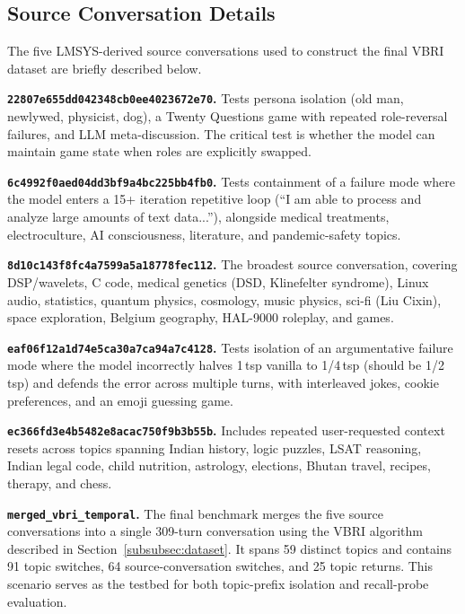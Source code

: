 \documentclass[pdflatex,sn-mathphys-num]{sn-jnl}%
\theoremstyle{thmstyleone}%
\theoremstyle{thmstyletwo}%
\theoremstyle{thmstylethree}%
\begin{document}
\begin{appendices}

\section{Source Conversation Details}\label{secA1}

The five LMSYS-derived source conversations used to construct the final VBRI dataset are briefly described below.

\textbf{\texttt{22807e655dd042348cb0ee4023672e70}.} Tests persona isolation (old man, newlywed, physicist, dog), a Twenty Questions game with repeated role-reversal failures, and LLM meta-discussion. The critical test is whether the model can maintain game state when roles are explicitly swapped.

\textbf{\texttt{6c4992f0aed04dd3bf9a4bc225bb4fb0}.} Tests containment of a failure mode where the model enters a 15+ iteration repetitive loop (``I am able to process and analyze large amounts of text data...''), alongside medical treatments, electroculture, AI consciousness, literature, and pandemic-safety topics.

\textbf{\texttt{8d10c143f8fc4a7599a5a18778fec112}.} The broadest source conversation, covering DSP/wavelets, C code, medical genetics (DSD, Klinefelter syndrome), Linux audio, statistics, quantum physics, cosmology, music physics, sci-fi (Liu Cixin), space exploration, Belgium geography, HAL-9000 roleplay, and games.

\textbf{\texttt{eaf06f12a1d74e5ca30a7ca94a7c4128}.} Tests isolation of an argumentative failure mode where the model incorrectly halves 1\,tsp vanilla to 1/4\,tsp (should be 1/2\,tsp) and defends the error across multiple turns, with interleaved jokes, cookie preferences, and an emoji guessing game.

\textbf{\texttt{ec366fd3e4b5482e8acac750f9b3b55b}.} Includes repeated user-requested context resets across topics spanning Indian history, logic puzzles, LSAT reasoning, Indian legal code, child nutrition, astrology, elections, Bhutan travel, recipes, therapy, and chess.

\textbf{\texttt{merged\_vbri\_temporal}.} The final benchmark merges the five source conversations into a single 309-turn conversation using the VBRI algorithm described in Section~\ref{subsubsec:dataset}. It spans 59 distinct topics and contains 91 topic switches, 64 source-conversation switches, and 25 topic returns. This scenario serves as the testbed for both topic-prefix isolation and recall-probe evaluation.


\end{appendices}
\end{document}
